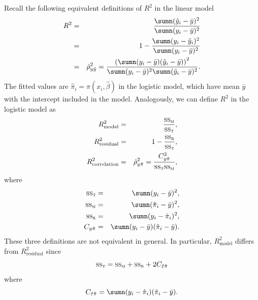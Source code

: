 Recall the following equivalent definitions of $R^2$ in the linear model
\begin{eqnarray*}
R^2 &=& \frac{  \sumn (\hat{y}_i - \bar{y})^2  }{   \sumn (y_i - \bar{y})^2  } \\
&=& 1 - \frac{  \sumn (y_i - \hat{y}_i )^2  }{   \sumn (y_i - \bar{y})^2  } \\
&=& \hat{\rho}^2_{y\hat{y}} = \frac{  \left(  \sumn (y_i - \bar{y}) (\hat{y}_i - \bar{y})  \right)^2 }
{ \sumn (y_i - \bar{y})^2  \sumn (\hat{y}_i - \bar{y})^2  } . 
\end{eqnarray*}
The fitted values are $\hat{\pi}_i = \pi(x_i, \hat{\beta})$ in the logistic model, which have mean $\bar{y}$ with the intercept included in the model. Analogously, we can define $R^2$ in the logistic model as
\begin{eqnarray*}
R^2_{\text{model}} &=&  \frac{  \textsc{ss}_\textsc{m}  }{   \textsc{ss}_\textsc{t}  } , \\  
R^2_{\text{residual}} &=& 1 - \frac{  \textsc{ss}_\textsc{r}   }{   \textsc{ss}_\textsc{t}  } , \\ 
R^2_{\text{correlation}} &=&  \hat{\rho}^2_{y\hat{\pi}} = \frac{  C_{y\hat{\pi}}^2  }
{  \textsc{ss}_\textsc{t}    \textsc{ss}_\textsc{m} }  , 
\end{eqnarray*}
where
\begin{eqnarray*}
\textsc{ss}_\textsc{t} &=&  \sumn (y_i - \bar{y})^2,\\ 
\textsc{ss}_\textsc{m} &=& \sumn (\hat{\pi}_i - \bar{y})^2,\\ 
\textsc{ss}_\textsc{r} &=&   \sumn (y_i - \hat{\pi}_i )^2,\\ 
C_{y\hat{\pi}} &=& \sumn (y_i - \bar{y}) (\hat{\pi}_i  - \bar{y}).
\end{eqnarray*}
These three definitions are not equivalent in general. In particular, $R^2_{\text{model}} $ differs from $R^2_{\text{residual}} $ since
$$
\textsc{ss}_\textsc{t}  = \textsc{ss}_\textsc{m}  + \textsc{ss}_\textsc{r}  + 2 C_{\hat{\varepsilon} \hat{\pi}}
$$
where 
$$
 C_{\hat{\varepsilon} \hat{\pi}} = \sumn (y_i - \hat{\pi}_i )  (\hat{\pi}_i - \bar{y}). 
$$

